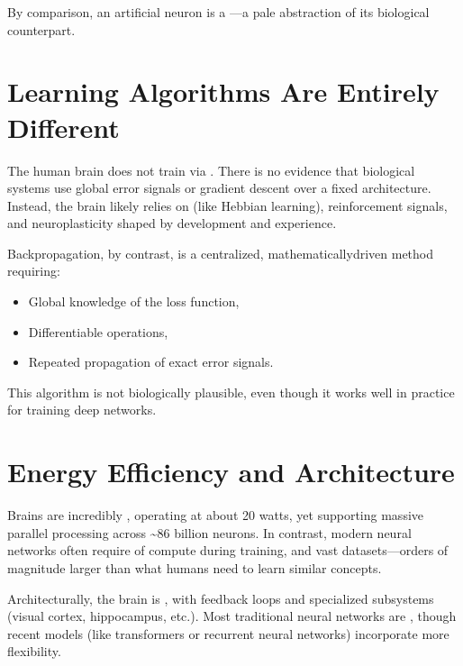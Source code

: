 \documentclass[letterpaper,10pt,english]{jupyterBook}
\begin{document}
\sphinxAtStartPar
By comparison, an artificial neuron is a —a pale abstraction of its biological counterpart.


\section{Learning Algorithms Are Entirely Different}
\label{\detokenize{neuralnets:learning-algorithms-are-entirely-different}}
\sphinxAtStartPar
The human brain does not train via . There is no evidence that biological systems use global error signals or gradient descent over a fixed architecture. Instead, the brain likely relies on  (like Hebbian learning), reinforcement signals, and neuroplasticity shaped by development and experience.

\sphinxAtStartPar
Backpropagation, by contrast, is a centralized, mathematically\sphinxhyphen{}driven method requiring:
\begin{itemize}
\item {} 
\sphinxAtStartPar
Global knowledge of the loss function,

\item {} 
\sphinxAtStartPar
Differentiable operations,

\item {} 
\sphinxAtStartPar
Repeated propagation of exact error signals.

\end{itemize}

\sphinxAtStartPar
This algorithm is not biologically plausible, even though it works well in practice for training deep networks.


\section{Energy Efficiency and Architecture}
\label{\detokenize{neuralnets:energy-efficiency-and-architecture}}
\sphinxAtStartPar
Brains are incredibly , operating at about 20 watts, yet supporting massive parallel processing across \textasciitilde{}86 billion neurons. In contrast, modern neural networks often require  of compute during training, and vast datasets—orders of magnitude larger than what humans need to learn similar concepts.

\sphinxAtStartPar
Architecturally, the brain is , with feedback loops and specialized subsystems (visual cortex, hippocampus, etc.). Most traditional neural networks are , though recent models (like transformers or recurrent neural networks) incorporate more flexibility.
\end{document}
